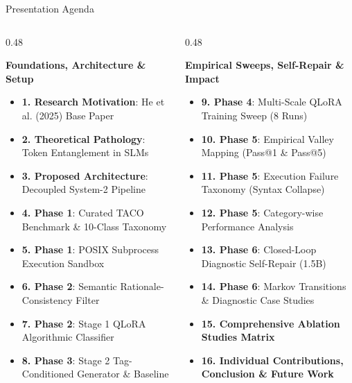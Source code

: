 \documentclass[aspectratio=169,10pt]{beamer}
\begin{document}
\begin{frame}{Presentation Agenda}
  \begin{columns}[T]
    \begin{column}{0.48\textwidth}
      \begin{block}{\textbf{Foundations, Architecture \& Setup}}
        \begin{itemize}\itemsep=3pt\scriptsize
          \item \textbf{1. Research Motivation}: He et al. (2025) Base Paper
          \item \textbf{2. Theoretical Pathology}: Token Entanglement in SLMs
          \item \textbf{3. Proposed Architecture}: Decoupled System-2 Pipeline
          \item \textbf{4. Phase 1}: Curated TACO Benchmark \& 10-Class Taxonomy
          \item \textbf{5. Phase 1}: POSIX Subprocess Execution Sandbox
          \item \textbf{6. Phase 2}: Semantic Rationale-Consistency Filter
          \item \textbf{7. Phase 2}: Stage 1 QLoRA Algorithmic Classifier
          \item \textbf{8. Phase 3}: Stage 2 Tag-Conditioned Generator \& Baseline
        \end{itemize}
      \end{block}
    \end{column}

    \begin{column}{0.48\textwidth}
      \begin{exampleblock}{\textbf{Empirical Sweeps, Self-Repair \& Impact}}
        \begin{itemize}\itemsep=3pt\scriptsize
          \item \textbf{9. Phase 4}: Multi-Scale QLoRA Training Sweep (8 Runs)
          \item \textbf{10. Phase 5}: Empirical Valley Mapping (Pass@1 \& Pass@5)
          \item \textbf{11. Phase 5}: Execution Failure Taxonomy (Syntax Collapse)
          \item \textbf{12. Phase 5}: Category-wise Performance Analysis
          \item \textbf{13. Phase 6}: Closed-Loop Diagnostic Self-Repair (1.5B)
          \item \textbf{14. Phase 6}: Markov Transitions \& Diagnostic Case Studies
          \item \textbf{15. Comprehensive Ablation Studies Matrix}
          \item \textbf{16. Individual Contributions, Conclusion \& Future Work}
        \end{itemize}
      \end{exampleblock}
    \end{column}
  \end{columns}
\end{frame}
\end{document}

